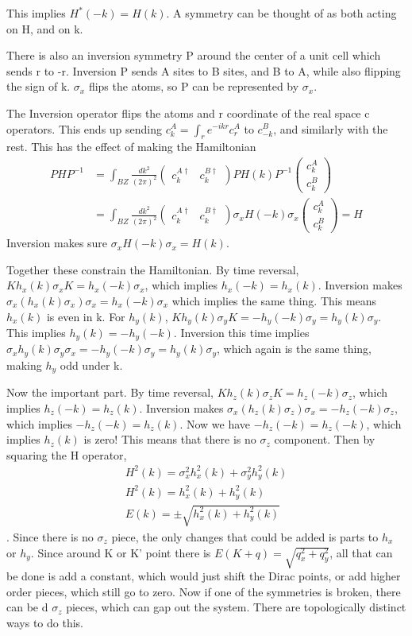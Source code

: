 This implies $H^*(-k) = H(k)$. A symmetry can be thought of as both acting on H, and on k.

There is also an inversion symmetry P around the center of a unit cell which sends r to -r. Inversion P sends A sites to B sites, and B to A, while also flipping the sign of k. $\sigma_x$ flips the atoms, so P can be represented by $\sigma_x$. 

The Inversion operator flips the atoms and r coordinate of the real space c operators. This ends up sending $c^A_k = \int_r e^{-ikr}c^A_r$ to $c^B_{-k}$, and similarly with the rest. This has the effect of making the Hamiltonian
\begin{align}
PHP^{-1}&=\int_{BZ}\frac{dk^2}{(2\pi)^2} 
\begin{pmatrix}
c^{A\dag}_k & c^{B\dag}_k
\end{pmatrix}
PH(k)P^{-1}
\begin{pmatrix}
c^{A}_k \\
c^{B}_k
\end{pmatrix} \\
&= \int_{BZ}\frac{dk^2}{(2\pi)^2}
\begin{pmatrix}
c^{A\dag}_k & c^{B\dag}_k
\end{pmatrix}
\sigma_x H(-k) \sigma_x
\begin{pmatrix}
c^{A}_k \\
c^{B}_k
\end{pmatrix}
= H
\end{align}
Inversion makes sure $\sigma_x H(-k) \sigma_x =H(k)$. 

Together these constrain the Hamiltonian. By time reversal, $Kh_x(k) \sigma_xK = h_x(-k)\sigma_x$, which implies $h_x(-k)=h_x(k)$. Inversion makes $\sigma_x (h_x(k) \sigma_x) \sigma_x =h_x(-k)\sigma_x$ which implies the same thing. This means $h_x(k)$ is even in k. For $h_y(k)$, $K h_y(k) \sigma_y K =-h_y(-k)\sigma_y= h_y(k)\sigma_y$. This implies $h_y(k) = -h_y(-k)$. Inversion this time implies  $\sigma_x h_y(k) \sigma_y \sigma_x =-h_y(-k)\sigma_y=  h_y(k)\sigma_y$, which again is the same thing, making $h_y$ odd under k.

Now the important part. By time reversal, $Kh_z(k) \sigma_zK = h_z(-k)\sigma_z$, which implies $h_z(-k)=h_z(k)$. Inversion makes $\sigma_x (h_z(k) \sigma_z) \sigma_x = -h_z(-k)\sigma_z$, which implies $-h_z(-k)=h_z(k)$. Now we have $-h_z(-k)=h_z(-k)$, which implies $h_z(k)$ is zero!
This means that there is no $\sigma_z$ component. Then by squaring the H operator,
\begin{align}
H^2(k)= \sigma_x^2 h_x^2(k) + \sigma_y^2 h_y^2(k) \\
H^2(k)= h_x^2(k) + h_y^2(k) \\
E(k)=\pm\sqrt{h_x^2(k) + h_y^2(k)}
\end{align}.
Since there is no $\sigma_z$ piece, the only changes that could be added is parts to $h_x$ or $h_y$. Since around K or K' point there is $E(K+q)=\sqrt{q_x^2+q_y^2}$, all that can be done is add a constant, which would just shift the Dirac points, or add higher order pieces, which still go to zero. Now if one of the symmetries is broken, there can be d $\sigma_z$ pieces, which can gap out the system. There are topologically distinct ways to do this.

